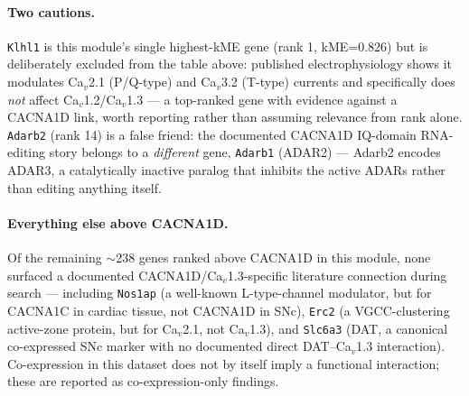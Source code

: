 \documentclass[11pt]{article}
\begin{document}
\paragraph{Two cautions.} \texttt{Klhl1} is this module's single highest-kME
gene (rank 1, kME=0.826) but is deliberately excluded from the table above:
published electrophysiology shows it modulates Ca$_v$2.1 (P/Q-type) and
Ca$_v$3.2 (T-type) currents and specifically does \emph{not} affect
Ca$_v$1.2/Ca$_v$1.3 --- a top-ranked gene with evidence against a CACNA1D
link, worth reporting rather than assuming relevance from rank alone.
\texttt{Adarb2} (rank 14) is a false friend: the documented CACNA1D
IQ-domain RNA-editing story belongs to a \emph{different} gene, \texttt{Adarb1}
(ADAR2) --- Adarb2 encodes ADAR3, a catalytically inactive paralog that
inhibits the active ADARs rather than editing anything itself.

\paragraph{Everything else above CACNA1D.} Of the remaining $\sim$238 genes
ranked above CACNA1D in this module, none surfaced a documented
CACNA1D/Ca$_v$1.3-specific literature connection during search --- including
\texttt{Nos1ap} (a well-known L-type-channel modulator, but for CACNA1C in
cardiac tissue, not CACNA1D in SNc), \texttt{Erc2} (a VGCC-clustering active-zone
protein, but for Ca$_v$2.1, not Ca$_v$1.3), and \texttt{Slc6a3} (DAT, a
canonical co-expressed SNc marker with no documented direct DAT--Ca$_v$1.3
interaction). Co-expression in this dataset does not by itself imply a
functional interaction; these are reported as co-expression-only findings.
\end{document}
